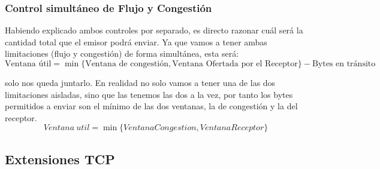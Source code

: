 \subsubsection{Control simultáneo de Flujo y Congestión}
    Habiendo explicado ambos controles por separado, es directo razonar cuál será la cantidad total que el emisor podrá enviar. Ya que vamos a tener ambas limitaciones (flujo y congestión) de forma simultánea, esta será:
    \begin{equation*}
        \text{Ventana útil} = \min\{\text{Ventana de congestión}, \text{Ventana Ofertada por el Receptor}\} - \text{Bytes en tránsito}
    \end{equation*}
    
    
    
    solo nos queda juntarlo. En realidad no solo vamos a tener una de las dos limitaciones aisladas, sino que las tenemos las dos a la vez, por tanto los bytes permitidos a enviar son el mínimo de las dos ventanas, la de congestión y la del receptor.
        \begin{equation*}
            Ventana \ util = \min\{VentanaCongestion, VentanaReceptor\}
        \end{equation*}

\subsection{Extensiones \acrshort{TCP}}

